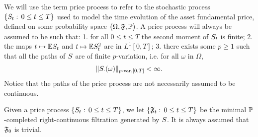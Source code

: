 \documentclass[10pt,a4paper]{article}
\begin{document}
%	

	We will use the term price process to refer to the stochastic process $\lbrace \fundamentalPrice_t:\, 0\leq t\leq T\rbrace$ used to model the time  evolution of the asset fundamental price, defined on some probability space $\probabilitySpace$. A price process will always be assumed to be such that: 1. for all $0\leq t\leq T$ the second moment of $\fundamentalPrice_t$ is finite; 2. the maps $t\mapsto \Expectation\fundamentalPrice_t$ and $t\mapsto \Expectation\fundamentalPrice\squared_t$ are in $L^1[0,T]$; 3. there exists some $p\geq 1$ such that all the paths of $\fundamentalPrice$ are of finite $p$-variation, i.e. for all $\omega$ in $\Omega$, 
	\begin{equation*}
	\pvarNormInterval[\fundamentalPrice_{\cdot} (\omega)]{p}{\timeWindow} < \infty. 
	\end{equation*}
	Notice that the paths of the price process are not necessarily assumed to be continuous.
	
	Given a price process  $\lbrace \fundamentalPrice_t:\, 0\leq t\leq T\rbrace$, we let $\lbrace \sigmaAlgebra_t: \, 0\leq t\leq T\rbrace$ be the minimal $\Prob$-completed right-continuous filtration generated by $\fundamentalPrice$. It is always assumed that $\sigmaAlgebra_0$ is trivial. 
	
\end{document}
